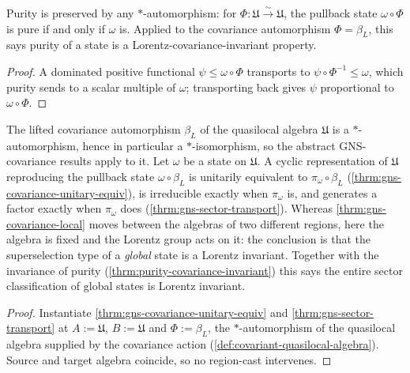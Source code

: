 \begin{theorem}
    \label{thrm:purity-covariance-invariant}
    \leanok
    Purity is preserved by any $*$-automorphism: for $\Phi : \mathfrak{U} \xrightarrow{\sim} \mathfrak{U}$, the pullback state $\omega \circ \Phi$ is pure if and only if $\omega$ is. Applied to the covariance automorphism $\Phi = \beta_L$, this says purity of a state is a Lorentz-covariance-invariant property.
\end{theorem}
\begin{proof}
    \leanok
    A dominated positive functional $\psi \le \omega \circ \Phi$ transports to $\psi \circ \Phi^{-1} \le \omega$, which purity sends to a scalar multiple of $\omega$; transporting back gives $\psi$ proportional to $\omega \circ \Phi$.
\end{proof}

\begin{theorem}
    \label{thrm:gns-covariance-quasilocal-action}
    \leanok
    The lifted covariance automorphism $\beta_L$ of the quasilocal algebra $\mathfrak{U}$ is a $*$-automorphism, hence in particular a $*$-isomorphism, so the abstract GNS-covariance results apply to it. Let $\omega$ be a state on $\mathfrak{U}$. A cyclic representation of $\mathfrak{U}$ reproducing the pullback state $\omega \circ \beta_L$ is unitarily equivalent to $\pi_\omega \circ \beta_L$ (\ref{thrm:gns-covariance-unitary-equiv}), is irreducible exactly when $\pi_\omega$ is, and generates a factor exactly when $\pi_\omega$ does (\ref{thrm:gns-sector-transport}). Whereas \ref{thrm:gns-covariance-local} moves between the algebras of two different regions, here the algebra is fixed and the Lorentz group acts on it: the conclusion is that the superselection type of a \emph{global} state is a Lorentz invariant. Together with the invariance of purity (\ref{thrm:purity-covariance-invariant}) this says the entire sector classification of global states is Lorentz invariant.
\end{theorem}
\begin{proof}
    \leanok
    Instantiate \ref{thrm:gns-covariance-unitary-equiv} and \ref{thrm:gns-sector-transport} at $A := \mathfrak{U}$, $B := \mathfrak{U}$ and $\Phi := \beta_L$, the $*$-automorphism of the quasilocal algebra supplied by the covariance action (\ref{def:covariant-quasilocal-algebra}). Source and target algebra coincide, so no region-cast intervenes.
\end{proof}

